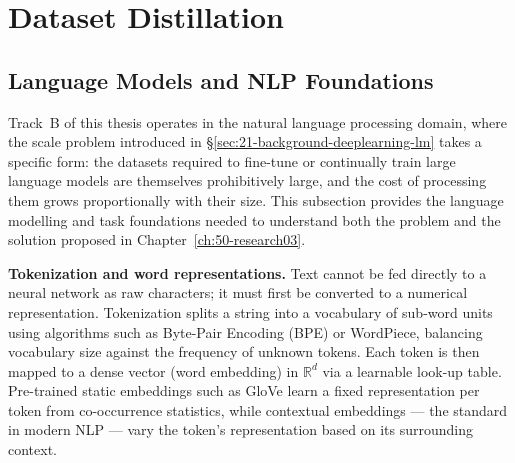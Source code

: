 \section{Dataset Distillation} \label{sec:26-background-datasetdistillation}

\subsection{Language Models and \ac{NLP} Foundations}
\label{sec:26-background-datasetdistillation-nlpfoundations}

\begin{foldable}
  Track~B of this thesis operates in the natural language processing domain, where the scale problem introduced in \S\ref{sec:21-background-deeplearning-lm} takes a specific form: the datasets required to fine-tune or continually train large language models are themselves prohibitively large, and the cost of processing them grows proportionally with their size.
  This subsection provides the language modelling and task foundations needed to understand both the problem and the solution proposed in Chapter~\ref{ch:50-research03}.
\end{foldable}

\begin{foldable}
  \textbf{Tokenization and word representations.}
  Text cannot be fed directly to a neural network as raw characters; it must first be converted to a numerical representation.
  Tokenization splits a string into a vocabulary of sub-word units using algorithms such as
  Byte-Pair Encoding (BPE) or WordPiece, balancing vocabulary size against the frequency of unknown tokens.
  Each token is then mapped to a dense vector (word embedding) in $\mathbb{R}^d$ via a learnable look-up table.
  Pre-trained static embeddings such as GloVe learn a fixed representation per token from co-occurrence statistics, while contextual embeddings --- the standard in modern \ac{NLP} --- vary the token's representation based on its surrounding context.
\end{foldable}

